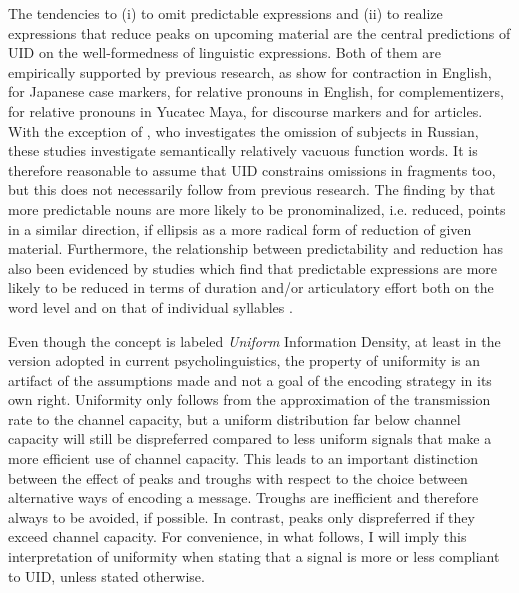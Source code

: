 The tendencies to (i) to omit predictable expressions and (ii) to realize expressions that reduce peaks on upcoming material are the central predictions of UID on the well-formedness of linguistic expressions. Both of them are empirically supported by previous research, as \citet{frank.jaeger2008} show for contraction in English, \citet{kurumada.jaeger2015} for Japanese case markers, \citet{levy.jaeger2007} for relative pronouns in English, \citet{jaeger2010} for complementizers, \citet{norcliffe.jaeger2016} for relative pronouns in Yucatec Maya, \citet{asr.demberg2015} for discourse markers and \citet{lemke.etal2017} for articles. With the exception of \citet{kravtchenko2014}, who investigates the omission of subjects in Russian, these studies investigate semantically relatively vacuous function words. It is therefore reasonable to assume that UID constrains omissions in fragments too, but this does not necessarily follow from previous research. The finding by \citet{tily.piantadosi2009} that more predictable nouns are more likely to be pronominalized, i.e. reduced, points in a similar direction, if ellipsis as a more radical form of reduction of given material. Furthermore, the relationship between predictability and reduction has also been evidenced by studies which find that predictable expressions are more likely to be reduced in terms of duration and/or articulatory effort both on the word level and on that of individual syllables \citep[see e.g.][]{bell.etal2003, aylett.turk2004,  bell.etal2009, tily.etal2009, demberg.etal2012, kuperman.bresnan2012, seyfarth2014, pate.goldwater2015, brandt.etal2017, brandt.etal2018,  malisz.etal2018}.

Even though the concept is labeled \textit{Uniform} Information Density, at least in the version adopted in current psycholinguistics, the property of uniformity is an artifact of the assumptions made and not a goal of the encoding strategy in its own right. Uniformity only follows from the approximation of the transmission rate to the channel capacity, but a uniform distribution far below channel capacity will still be dispreferred compared to less uniform signals that make a more efficient use of channel capacity. This leads to an important distinction between the effect of peaks and troughs with respect to the choice between alternative ways of encoding a message. Troughs are inefficient and therefore always to be avoided, if possible. In contrast, peaks only dispreferred if they exceed channel capacity. For convenience, in what follows, I will imply this interpretation of uniformity when stating that a signal is more or less compliant to UID, unless stated otherwise.

